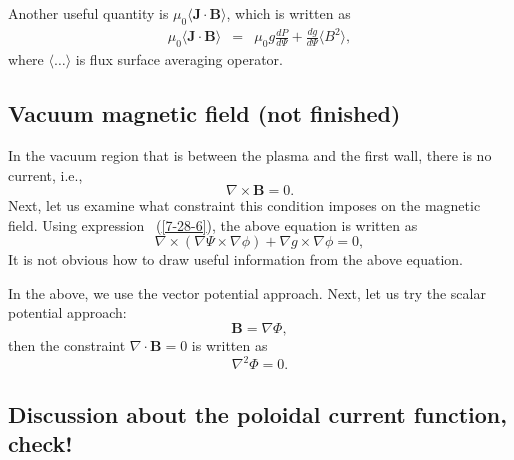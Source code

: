 \documentclass{llncs}
\begin{document}
Another useful quantity is $\mu_0 \langle \mathbf{J} \cdot \mathbf{B}
\rangle$, which is written as
\begin{eqnarray}
  \mu_0 \langle \mathbf{J} \cdot \mathbf{B} \rangle & = & \mu_0 g \frac{d P}{d
  \Psi} + \frac{d g}{d \Psi} \langle B^2 \rangle, 
\end{eqnarray}
where $\langle \ldots \rangle$ is flux surface averaging operator.

\subsection{Vacuum magnetic field (not finished)}

In the vacuum region that is between the plasma and the first wall, there is
no current, i.e.,
\begin{equation}
  \nabla \times \mathbf{B}= 0.
\end{equation}
Next, let us examine what constraint this condition imposes on the magnetic
field. Using expression \ (\ref{7-28-6}), the above equation is written as
\begin{equation}
  \nabla \times (\nabla \Psi \times \nabla \phi) + \nabla g \times \nabla \phi
  = 0,
\end{equation}
It is not obvious how to draw useful information from the above equation.

In the above, we use the vector potential approach. Next, let us try the
scalar potential approach:
\begin{equation}
  \mathbf{B}= \nabla \Phi,
\end{equation}
then the constraint $\nabla \cdot \mathbf{B}= 0$ is written as
\begin{equation}
  \nabla^2 \Phi = 0.
\end{equation}

\subsection{Discussion about the poloidal current function,
check!}\label{11-2-p4}

\
\end{document}

